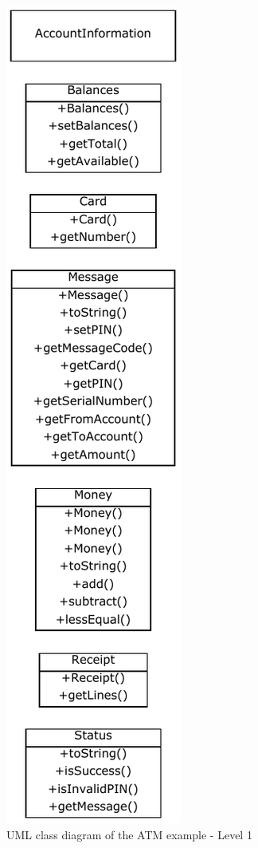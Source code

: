 \begin{figure}[!ht]
\centering
\begin{minipage}[b]{0.47\linewidth}
\includegraphics{Figures/Example2a1.pdf}
\caption{UML class diagram of the ATM example - Level 1}

\end{minipage}
\end{figure}
